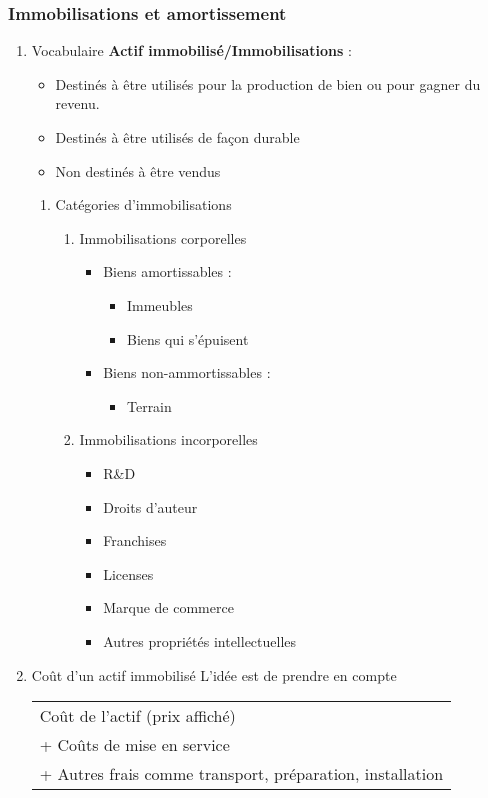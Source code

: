 \documentclass[11pt]{article}
\begin{document}
\subsubsection{Immobilisations et amortissement}
\label{sec:org8cead7e}
\begin{enumerate}
\item Vocabulaire
\label{sec:orge60d776}
\textbf{Actif immobilisé/Immobilisations} : 
\begin{itemize}
\item Destinés à être utilisés pour la production de bien ou pour gagner du revenu.
\item Destinés à être utilisés de façon durable
\item Non destinés à être vendus
\end{itemize}
\begin{enumerate}
\item Catégories d'immobilisations
\label{sec:orgbca96a3}
\begin{enumerate}
\item Immobilisations corporelles
\label{sec:org59a97ae}
\begin{itemize}
\item Biens amortissables : 
\begin{itemize}
\item Immeubles
\item Biens qui s'épuisent
\end{itemize}
\item Biens non-ammortissables : 
\begin{itemize}
\item Terrain
\end{itemize}
\end{itemize}
\item Immobilisations incorporelles
\label{sec:org71d7741}
\begin{itemize}
\item R\&D
\item Droits d'auteur
\item Franchises
\item Licenses
\item Marque de commerce
\item Autres propriétés intellectuelles
\end{itemize}
\end{enumerate}
\end{enumerate}

\item Coût d'un actif immobilisé
\label{sec:orgcdd165a}
L'idée est de prendre en compte 
\begin{center}
\begin{tabular}{l}
Coût de l'actif (prix affiché)\\
+ Coûts de mise en service\\
+ Autres frais comme transport, préparation, installation\\
\end{tabular}
\end{center}


\end{enumerate}
\end{document}
